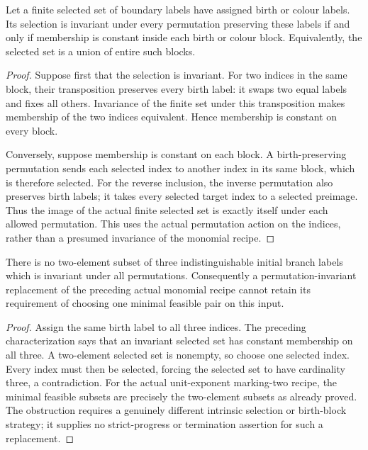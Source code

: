 \begin{theorem}
\label{hir:actual-intrinsic-birth-block-selection-characterization}
Let a finite selected set of boundary labels have assigned birth or
colour labels. Its selection is invariant under every permutation
preserving these labels if and only if membership is constant inside
each birth or colour block. Equivalently, the selected set is a union
of entire such blocks.
\leanok
{}
\end{theorem}
\begin{proof}
Suppose first that the selection is invariant. For two indices in the
same block, their transposition preserves every birth label: it swaps
two equal labels and fixes all others. Invariance of the finite set
under this transposition makes membership of the two indices
equivalent. Hence membership is constant on every block.

Conversely, suppose membership is constant on each block. A
birth-preserving permutation sends each selected index to another
index in its same block, which is therefore selected. For the reverse
inclusion, the inverse permutation also preserves birth labels; it
takes every selected target index to a selected preimage. Thus the
image of the actual finite selected set is exactly itself under each
allowed permutation. This uses the actual permutation action on the
indices, rather than a presumed invariance of the monomial recipe.
\end{proof}

\begin{corollary}
\label{hir:actual-three-branch-no-symmetric-minimal-feasible-pair}
There is no two-element subset of three indistinguishable initial
branch labels which is invariant under all permutations. Consequently
a permutation-invariant replacement of the preceding actual monomial
recipe cannot retain its requirement of choosing one minimal feasible
pair on this input.
\leanok
{}
\end{corollary}
\begin{proof}
Assign the same birth label to all three indices. The preceding
characterization says that an invariant selected set has constant
membership on all three. A two-element selected set is nonempty, so
choose one selected index. Every index must then be selected, forcing
the selected set to have cardinality three, a contradiction. For the
actual unit-exponent marking-two recipe, the minimal feasible subsets
are precisely the two-element subsets as already proved. The
obstruction requires a genuinely different intrinsic selection or
birth-block strategy; it supplies no strict-progress or termination
assertion for such a replacement.
\end{proof}
